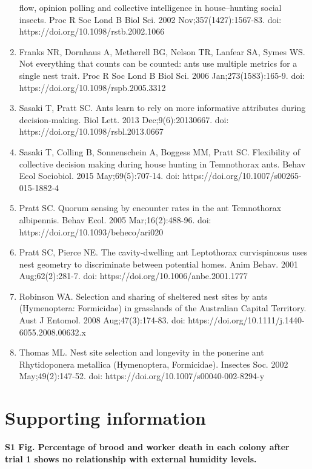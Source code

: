 \documentclass[3p]{elsarticle} %
\begin{document}
\begin{enumerate}
  flow, opinion polling and collective intelligence in house--hunting
  social insects. Proc R Soc Lond B Biol Sci. 2002
  Nov;357(1427):1567-83. doi: https://doi.org/10.1098/rstb.2002.1066
\item
  Franks NR, Dornhaus A, Metherell BG, Nelson TR, Lanfear SA, Symes WS.
  Not everything that counts can be counted: ants use multiple metrics
  for a single nest trait. Proc R Soc Lond B Biol Sci. 2006
  Jan;273(1583):165-9. doi: https://doi.org/10.1098/rspb.2005.3312
\item
  Sasaki T, Pratt SC. Ants learn to rely on more informative attributes
  during decision-making. Biol Lett. 2013 Dec;9(6):20130667. doi:
  https://doi.org/10.1098/rsbl.2013.0667
\item
  Sasaki T, Colling B, Sonnenschein A, Boggess MM, Pratt SC. Flexibility
  of collective decision making during house hunting in Temnothorax
  ants. Behav Ecol Sociobiol. 2015 May;69(5):707-14. doi:
  https://doi.org/10.1007/s00265-015-1882-4
\item
  Pratt SC. Quorum sensing by encounter rates in the ant Temnothorax
  albipennis. Behav Ecol. 2005 Mar;16(2):488-96. doi:
  https://doi.org/10.1093/beheco/ari020
\item
  Pratt SC, Pierce NE. The cavity-dwelling ant Leptothorax curvispinosus
  uses nest geometry to discriminate between potential homes. Anim
  Behav. 2001 Aug;62(2):281-7. doi:
  https://doi.org/10.1006/anbe.2001.1777
\item
  Robinson WA. Selection and sharing of sheltered nest sites by ants
  (Hymenoptera: Formicidae) in grasslands of the Australian Capital
  Territory. Aust J Entomol. 2008 Aug;47(3):174-83. doi:
  https://doi.org/10.1111/j.1440-6055.2008.00632.x
\item
  Thomas ML. Nest site selection and longevity in the ponerine ant
  Rhytidoponera metallica (Hymenoptera, Formicidae). Insectes Soc. 2002
  May;49(2):147-52. doi: https://doi.org/10.1007/s00040-002-8294-y
\end{enumerate}

\hypertarget{supporting-information}{%
\section{Supporting information}\label{supporting-information}}

\textbf{S1 Fig. Percentage of brood and worker death in each colony
after trial 1 shows no relationship with external humidity levels.}
\end{document}
